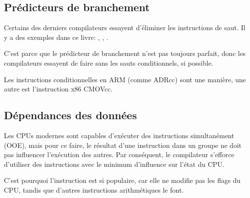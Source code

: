 ﻿

\subsection{Prédicteurs de branchement}
\label{branch_predictors}

Certains des derniers compilateurs essayent d'éliminer les instructions de saut.
Il y a des exemples dans ce livre: , , .

C'est parce que le prédicteur de branchement n'est pas toujours parfait, donc les
compilateurs essayent de faire sans les sauts conditionnels, si possible.

Les instructions conditionnelles en ARM (comme ADRcc) sont une manière, une autre est
l'instruction x86 CMOVcc.

\subsection{Dépendances des données}

Les CPUs modernes sont capables d'exécuter des instructions simultanément (\ac{OOE}),
mais pour ce faire, le résultat d'une instruction dans un groupe ne doit pas influencer
l'exécution des autres.
Par conséquent, le compilateur s'efforce d'utiliser des instructions avec le minimum
d'influence sur l'état du CPU.

C'est pourquoi l'instruction \LEA est si populaire, car elle ne modifie pas les flags
du CPU, tandis que d'autres instructions arithmétiques le font.
